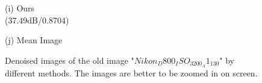 \documentclass[10pt,twocolumn,letterpaper]{article}
\begin{document}
\begin{figure}
{\begin{minipage}[t]{0.2\textwidth}
{\footnotesize (i) Ours \\  (37.49dB/0.8704)   }
\end{minipage}
\begin{minipage}[t]{0.2\textwidth}
\centering
{}
{\footnotesize (j) Mean Image }
\end{minipage}
}
\caption{Denoised images of the old image "$Nikon_D800_ISO_3200_A1_130$" by different methods. The images are better to be zoomed in on screen.}
\label{fig2}
\end{figure}
\end{document}
